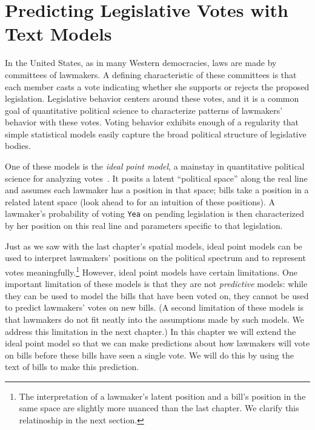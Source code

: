 \chapter{Predicting Legislative Votes with Text Models}
\label{chapter:predicting_votes}

In the United States, as in many Western democracies, laws are made by
committees of lawmakers.  A defining characteristic of these
committees is that each member casts a vote indicating whether she
supports or rejects the proposed legislation. Legislative behavior
centers around these votes, and it is a common goal of quantitative
political science to characterize patterns of lawmakers' behavior with
these votes. Voting behavior exhibits enough of a regularity that
simple statistical models easily capture the broad political structure
of legislative bodies.

One of these models is the \emph{ideal point model}, a mainstay in
quantitative political science for analyzing
votes~\citep{clinton:2004}.  It posits a latent ``political space''
along the real line and assumes each lawmaker has a position in that
space; bills take a position in a related latent space (look ahead to
 for an intuition of these positions).
A lawmaker's probability of voting \verb!Yea! on pending legislation
is then characterized by her position on this real line and parameters
specific to that legislation.

Just as we saw with the last chapter's spatial models, ideal point
models can be used to interpret lawmakers' positions on the political
spectrum and to represent votes meaningfully.\footnote{The
  interpretation of a lawmaker's latent position and a bill's position
  in the same space are slightly more nuanced than the last chapter.
  We clarify this relatinoship in the next section.}  However, ideal
point models have certain limitations.  One important limitation of
these models is that they are not \emph{predictive} models: while they
can be used to model the bills that have been voted on, they cannot be
used to predict lawmakers' votes on new bills.  (A second limitation
of these models is that lawmakers do not fit neatly into the
assumptions made by such models.  We address this limitation in the
next chapter.)  In this chapter we will extend the ideal point model
so that we can make predictions about how lawmakers will vote on bills
before these bills have seen a single vote.  We will do this by using
the text of bills to make this prediction.

